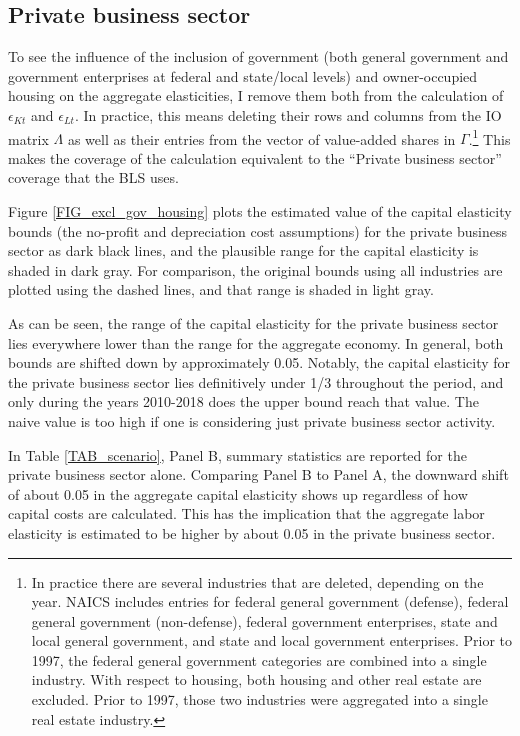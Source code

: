 \documentclass[11pt]{article}
\begin{document}
\subsection{Private business sector}
To see the influence of the inclusion of government (both general government and government enterprises at federal and state/local levels) and owner-occupied housing on the aggregate elasticities, I remove them both from the calculation of $\epsilon_{Kt}$ and $\epsilon_{Lt}$. In practice, this means deleting their rows and columns from the IO matrix $\Lambda$ as well as their entries from the vector of value-added shares in $\Gamma$.\footnote{In practice there are several industries that are deleted, depending on the year. NAICS includes entries for federal general government (defense), federal general government (non-defense), federal government enterprises, state and local general government, and state and local government enterprises. Prior to 1997, the federal general government categories are combined into a single industry. With respect to housing, both housing and other real estate are excluded. Prior to 1997, those two industries were aggregated into a single real estate industry.} This makes the coverage of the calculation equivalent to the ``Private business sector'' coverage that the BLS uses. 

Figure \ref{FIG_excl_gov_housing} plots the estimated value of the capital elasticity bounds (the no-profit and depreciation cost assumptions) for the private business sector as dark black lines, and the plausible range for the capital elasticity is shaded in dark gray. For comparison, the original bounds using all industries are plotted using the dashed lines, and that range is shaded in light gray. 

As can be seen, the range of the capital elasticity for the private business sector lies everywhere lower than the range for the aggregate economy. In general, both bounds are shifted down by approximately 0.05. Notably, the capital elasticity for the private business sector lies definitively under 1/3 throughout the period, and only during the years 2010-2018 does the upper bound reach that value. The naive value is too high if one is considering just private business sector activity.  

In Table \ref{TAB_scenario}, Panel B, summary statistics are reported for the private business sector alone. Comparing Panel B to Panel A, the downward shift of about 0.05 in the aggregate capital elasticity shows up regardless of how capital costs are calculated. This has the implication that the aggregate labor elasticity is estimated to be higher by about 0.05 in the private business sector. 
\end{document}
